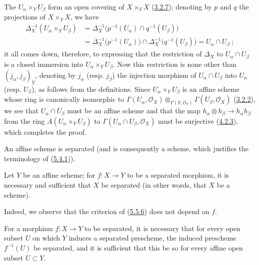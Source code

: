 The $U_\alpha\times_Y U_\beta$ form an open covering of
$X\times_Y X$ (\hyperref[I.3.2.7]{3.2.7}); denoting by $p$ and $q$ the
projections of $X\times_Y X$, we have
\[
  \begin{aligned}
    \Delta_X^{-1}(U_\alpha\times_Y U_\beta)
      &=\Delta_X^{-1}\bigl(p^{-1}(U_\alpha)\cap q^{-1}(U_\beta)\bigr)\\
      &=\Delta_X^{-1}\bigl(p^{-1}(U_\alpha)\bigr)
        \cap\Delta_X^{-1}\bigl(q^{-1}(U_\beta)\bigr)
        =U_\alpha\cap U_\beta~;
  \end{aligned}
\]
it all comes down, therefore, to expressing that the restriction of
$\Delta_X$ to $U_\alpha\cap U_\beta$ is a closed immersion into
$U_\alpha\times_Y U_\beta$. Now this restriction is none other than
$(j_\alpha,j_\beta)_Y$, denoting by $j_\alpha$ (resp. $j_\beta$) the
injection morphism of $U_\alpha\cap U_\beta$ into $U_\alpha$ (resp.
$U_\beta$), as follows from the definitions. Since
$U_\alpha\times_Y U_\beta$ is an affine scheme whose ring is
canonically isomorphic to
$\Gamma(U_\alpha,\mathscr{O}_X)
 \otimes_{\Gamma(Y,\mathscr{O}_Y)}
 \Gamma(U_\beta,\mathscr{O}_X)$
(\hyperref[I.3.2.2]{3.2.2}), we see that $U_\alpha\cap U_\beta$ must be
an affine scheme and that the map
$h_\alpha\otimes h_\beta\to h_\alpha h_\beta$ from the ring
$A(U_\alpha\times_Y U_\beta)$ to
$\Gamma(U_\alpha\cap U_\beta,\mathscr{O}_X)$ must be surjective
(\hyperref[I.4.2.3]{4.2.3}), which completes the proof.

\begin{corollary}[5.5.7]
\label{I.5.5.7}
An affine scheme is separated (and is consequently a scheme, which justifies
the terminology of (\hyperref[I.5.4.1]{5.4.1})).
\end{corollary}

\begin{corollary}[5.5.8]
\label{I.5.5.8}
Let $Y$ be an affine scheme; for $f:X\to Y$ to be a separated morphism, it
is necessary and sufficient that $X$ be separated (in other words, that $X$
be a scheme).
\end{corollary}

Indeed, we observe that the criterion of
(\hyperref[I.5.5.6]{5.5.6}) does not depend on $f$.

\begin{corollary}[5.5.9]
\label{I.5.5.9}
For a morphism $f:X\to Y$ to be separated, it is necessary that for every
open subset $U$ on which $Y$ induces a separated prescheme, the induced
prescheme $f^{-1}(U)$ be separated, and it is sufficient that this be so for
every affine open subset $U\subset Y$.
\end{corollary}

